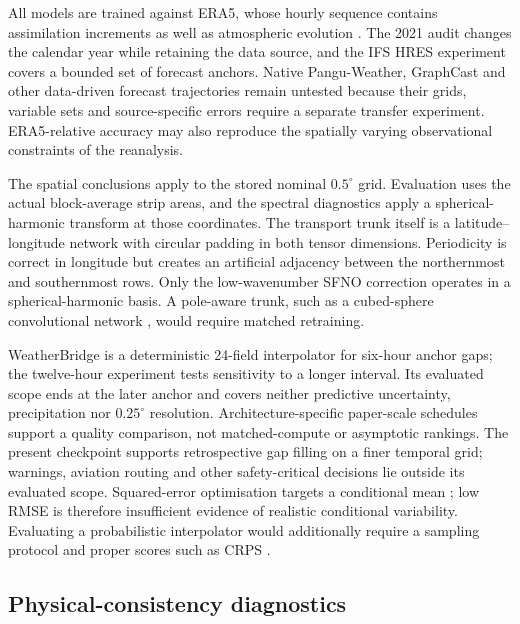 \documentclass[referee,lineno,pdflatex,sn-nature]{sn-jnl}
\begin{document}


All models are trained against ERA5, whose hourly sequence contains
assimilation increments as well as atmospheric evolution
\cite{ingstad2026hourglass}. The 2021 audit changes the calendar year while
retaining the data source, and the IFS HRES experiment covers a bounded set of
forecast anchors. Native Pangu-Weather, GraphCast and other data-driven
forecast trajectories remain untested because their grids, variable sets and
source-specific errors require a separate transfer experiment. ERA5-relative accuracy
may also reproduce the spatially varying observational constraints of the
reanalysis.

The spatial conclusions apply to the stored nominal $0.5^\circ$ grid.
Evaluation uses the actual block-average strip areas, and the spectral
diagnostics apply a spherical-harmonic transform at those coordinates. The
transport trunk itself is a latitude--longitude network with circular padding
in both tensor dimensions. Periodicity is correct in longitude but creates an
artificial adjacency between the northernmost and southernmost rows. Only the
low-wavenumber SFNO correction operates in a spherical-harmonic basis. A
pole-aware trunk, such as a cubed-sphere convolutional network
\cite{weyn2020dlwp}, would require matched retraining.

WeatherBridge is a deterministic 24-field interpolator for six-hour anchor
gaps; the twelve-hour experiment tests sensitivity to a longer interval. Its
evaluated scope ends at the later anchor and covers neither predictive
uncertainty, precipitation nor $0.25^\circ$ resolution. Architecture-specific
paper-scale schedules support a quality comparison, not matched-compute or
asymptotic rankings. The present checkpoint supports retrospective gap filling
on a finer temporal grid; warnings, aviation routing and other safety-critical
decisions lie outside its evaluated scope.
Squared-error optimisation targets a conditional mean
\cite{gneiting2011point}; low RMSE is therefore insufficient evidence of
realistic conditional variability. Evaluating a probabilistic interpolator
would additionally require a sampling protocol and proper scores such as
CRPS \cite{gneiting2007proper}.

{}
{}

\subsection{Physical-consistency diagnostics}
\label{sec:physics_diagnostics}
\end{document}
